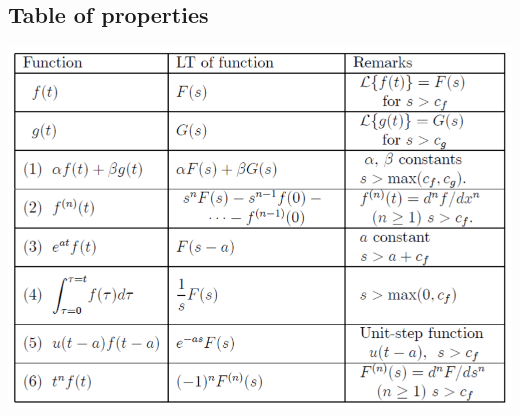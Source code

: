 \documentclass[11pt]{article}
\begin{document}
\subsection{Table of properties}
\label{sec:org55fc46c}
\begin{center}
\includegraphics[width=.9\linewidth]{./images/laplace-transform-properties.png}
\end{center}
\end{document}
